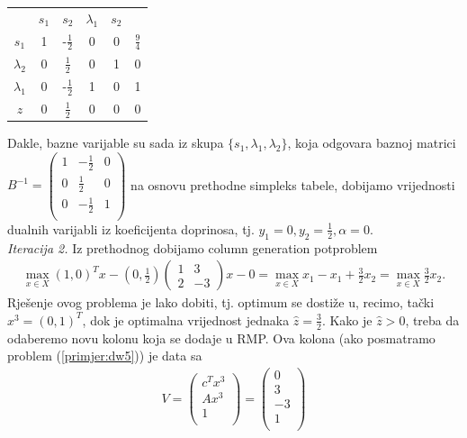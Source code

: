 \documentclass[a4paper, utf8, 11pt, colorlinks]{book}
\begin{document}
\begin{center}
	
	\begin{tabular}{c|ccccc}
	             	&$s_1$     &    $ s_2$                &  $\lambda_1$   & $s_2$     &                \\
		$s_1$	    &   1      &   -$\frac{1}{2}$         &   0         &     0         &  $\frac{9}{4}$ \\
		$\lambda_2$ &   0      &    $\frac{1}{2}$         &   0         &     1         &  0             \\
		$\lambda_1$ &   0      &    -$\frac{1}{2}$        &   1         &     0         &  1             \\ \hline
		$z$         &   0      &    $\frac{1}{2}$         &   0         &    0          &  0
	\end{tabular}
\end{center} 
Dakle, bazne varijable su sada iz skupa $\{s_1, \lambda_1, \lambda_2\}$, koja odgovara baznoj matrici 
$B^{-1} = 
\begin{pmatrix}
	   1 & -\frac{1}{2}    &  0 \\
	   0 & \frac{1}{2}     &  0  \\
	   0 & -\frac{1}{2}    &  1  \\
\end{pmatrix}$
na osnovu prethodne simpleks tabele, dobijamo   vrijednosti dualnih varijabli iz koeficijenta doprinosa, tj. $y_1 = 0, y_2 = \frac{1}{2}, \alpha = 0$. \\
\emph{Iteracija 2.} Iz prethodnog dobijamo column generation potproblem 
\begin{align}
	 \max_{x \in X} (1, 0)^T x - (0, \frac{1}{2})\left(\begin{array}{cc}
	 	1 & 3 \\
	 	2 & -3
	 \end{array}\right)  x   - 0 = \max_{x \in X}x_1 - x_1 + \frac{3}{2}x_2 = \max_{x \in X} \frac{3}{2}x_2.
\end{align}
Rješenje ovog problema je lako dobiti, tj. optimum se dostiže u, recimo,  tački $x^3 = (0, 1)^T$, dok je optimalna vrijednost jednaka $\hat{z}= \frac{3}{2}$. Kako je $\hat{z} > 0$, treba da odaberemo novu kolonu koja se dodaje u RMP. 
Ova kolona (ako posmatramo problem (\ref{primjer:dw5})) je   data sa 
\begin{align}
	V =   \begin{pmatrix}
		c^T x^3\\
		A x^3  \\
		1     \\
	\end{pmatrix} = \begin{pmatrix}
		0 \\
		3  \\
		-3  \\
		1\\  
	\end{pmatrix}
\end{align}
\end{document}

